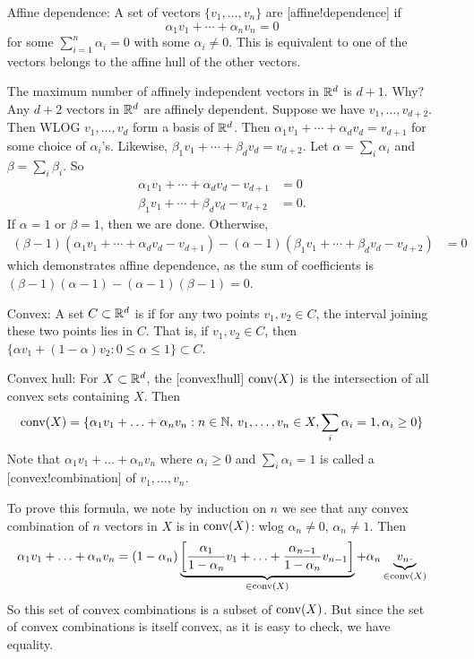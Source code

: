 \begin{itemize}[]
\item[Affine dependence:]A set of vectors $\{v_1,\dotsc,v_n\}$ are [affine!dependence] if 
\[
\alpha_1 v_1 + \dotsb + \alpha_n v_n = 0
\]
for some $\sum_{i=1}^n\alpha_i=0$ with some $\alpha_i \neq 0$. This is equivalent to one of the vectors belongs to the affine hull of the other vectors.
\begin{remark}
The maximum number of affinely independent vectors in $\mathbb{R}^d$ is $d+1$. Why? Any $d+2$ vectors in $\mathbb{R}^d$ are affinely dependent. Suppose we have $v_1,\dotsc,v_{d+2}$. Then WLOG $v_1,\dotsc,v_d$ form a basis of $\mathbb{R}^d$. Then $\alpha_1 v_1 + \dotsb + \alpha_d v_d = v_{d+1}$ for some choice of $\alpha_i$'s. Likewise, $\beta_1 v_1  +\dotsb + \beta_d v_d = v_{d+2}$. Let $\alpha = \sum_i \alpha_i$ and $\beta = \sum_i \beta_i$. So
\begin{align*}	
\alpha_1 v_1 + \dotsb + \alpha_d v_d - v_{d+1} &= 0\\
\beta_1 v_1 + \dotsb + \beta_d v_d - v_{d+2} &= 0.
\end{align*}If $\alpha=1$ or $\beta=1$, then we are done. Otherwise,
\begin{align*}	
(\beta-1)(\alpha_1 v_1 + \dotsb + \alpha_d v_d - v_{d+1}) - (\alpha-1)(\beta_1 v_1 + \dotsb + \beta_d v_d - v_{d+2} ) &= 0
\end{align*}
which demonstrates affine dependence, as the sum of coefficients is $(\beta-1)(\alpha-1) - (\alpha-1)(\beta-1)=0$.
\end{remark}


\item[Convex:] A set $C\subset \mathbb{R}^d$ is  if for any two points $v_1,v_2\in C$, the interval joining these two points lies in $C$. That is, if $v_1,v_2\in C$, then $\{\alpha v_1 + (1- \alpha)v_2: 0\leq \alpha \leq 1\} \subset C$.
\item[Convex hull:]  For $X\subset \mathbb{R}^d$, the [convex!hull] $\operatorname{conv}(X)$ is the intersection of all convex sets containing $X$. Then
\[
\operatorname{conv}(X) = \{\alpha_1 v_1 + \dotsc + \alpha_n v_n:n\in \mathbb{N},\, v_1,\dotsc,v_n\in X, \sum_i \alpha_i =1, \alpha_i\geq 0 \}
\]
Note that $\alpha_1 v_1 + \dotsc + \alpha_n v_n$ where $\alpha_i\geq 0$ and $\sum_i \alpha_i=1$ is called a [convex!combination] of $v_1,\dotsc,v_n$.

To prove this formula,  we note by induction on $n$ we see that any convex combination of $n$ vectors in $X$ is in $\operatorname{conv}(X)$: wlog $\alpha_n\neq 0$, $\alpha_n\neq 1$. Then 
\[
\alpha_1 v_1 + \dotsc + \alpha_n v_n = (1- \alpha_n) \underbrace{\left[ \frac{\alpha_1}{1- \alpha_n}v_1 + \dotsc + \frac{\alpha_{n-1}}{1 - \alpha_n} v_{n-1} \right]}_{\in \operatorname{conv}(X)} + \alpha_n \underbrace{ v_n.}_{\in \operatorname{conv}(X)}
\]
So this set of convex combinations is a subset of $\operatorname{conv}(X)$. But since the set of convex combinations is itself convex, as it is easy to check, we have equality.


\end{itemize}
